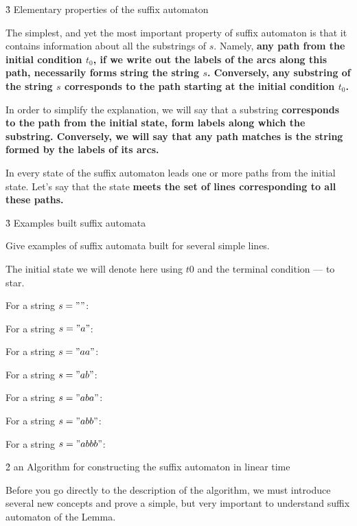 \h3{ Elementary properties of the suffix automaton }

The simplest, and yet the most important property of suffix automaton is that it contains information about all the substrings of $s$. Namely, \bf{any path} from the initial condition $t_0$, if we write out the labels of the arcs along this path, necessarily forms \bf{string} the string $s$. Conversely, any substring of the string $s$ corresponds to the path starting at the initial condition $t_0$.

In order to simplify the explanation, we will say that a substring \bf{corresponds to} the path from the initial state, form labels along which the substring. Conversely, we will say that any path \bf{matches} is the string formed by the labels of its arcs.

In every state of the suffix automaton leads one or more paths from the initial state. Let's say that the state \bf{meets} the set of lines corresponding to all these paths.


\h3{ Examples built suffix automata }

Give examples of suffix automata built for several simple lines.

The initial state we will denote here using $t0$ and the terminal condition --- to star.

For a string $s = ""$:


For a string $s = "a"$:


For a string $s = "aa"$:


For a string $s = "ab"$:


For a string $s = "aba"$:


For a string $s = "abb"$:


For a string $s = "abbb"$:




\h2{ an Algorithm for constructing the suffix automaton in linear time }

Before you go directly to the description of the algorithm, we must introduce several new concepts and prove a simple, but very important to understand suffix automaton of the Lemma.


